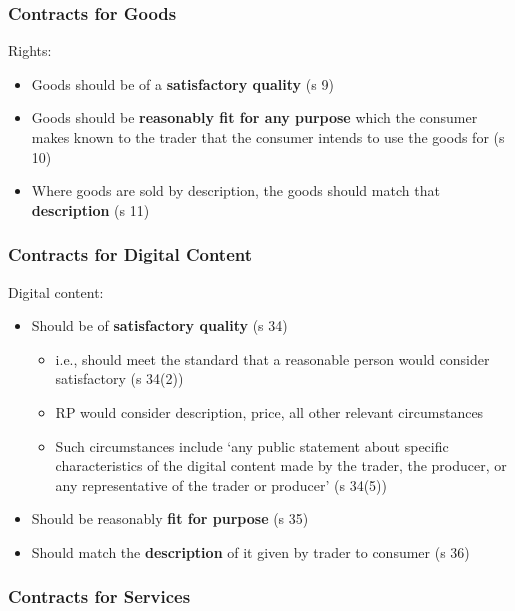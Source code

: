 \documentclass[
]{article}
\providecommand{\tightlist}{%
  \setlength{\itemsep}{0pt}\setlength{\parskip}{0pt}}
\begin{document}
\hypertarget{contracts-for-goods}{%
\subsubsection{Contracts for Goods}\label{contracts-for-goods}}

Rights:

\begin{itemize}
\tightlist
\item
  Goods should be of a \textbf{satisfactory quality} (s 9)
\item
  Goods should be \textbf{reasonably fit for any purpose} which the
  consumer makes known to the trader that the consumer intends to use
  the goods for (s 10)
\item
  Where goods are sold by description, the goods should match that
  \textbf{description} (s 11)
\end{itemize}

\hypertarget{contracts-for-digital-content}{%
\subsubsection{Contracts for Digital
Content}\label{contracts-for-digital-content}}

Digital content:

\begin{itemize}
\tightlist
\item
  Should be of \textbf{satisfactory quality} (s 34)

  \begin{itemize}
  \tightlist
  \item
    i.e., should meet the standard that a reasonable person would
    consider satisfactory (s 34(2))
  \item
    RP would consider description, price, all other relevant
    circumstances
  \item
    Such circumstances include `any public statement about specific
    characteristics of the digital content made by the trader, the
    producer, or any representative of the trader or producer' (s 34(5))
  \end{itemize}
\item
  Should be reasonably \textbf{fit for purpose} (s 35)
\item
  Should match the \textbf{description} of it given by trader to
  consumer (s 36)
\end{itemize}

\hypertarget{contracts-for-services}{%
\subsubsection{Contracts for Services}\label{contracts-for-services}}
\end{document}
